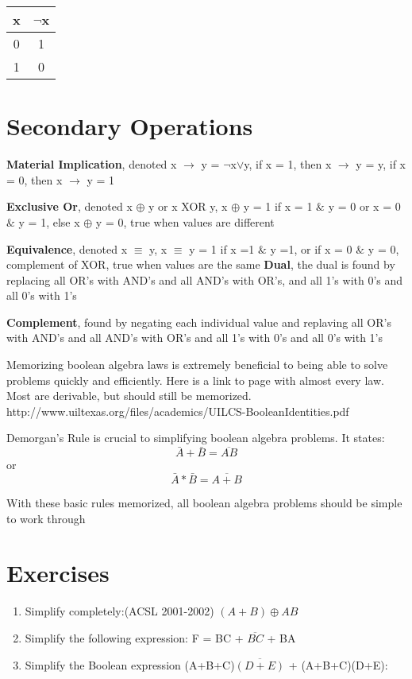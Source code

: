 \documentclass[10pt]{article}
\begin{document}
\begin{center}
\begin{tabular}{ |c|c| }
 \hline
 x & $\neg$x \\
 \hline
  0 & 1  \\
 \hline
 1 & 0 \\
 \hline
\end{tabular}
\end{center}

\section{Secondary Operations}

\textbf{Material Implication}, denoted  x $\rightarrow$ y = $\neg$x$\lor$y, if x = 1, then x $\rightarrow$ y = y, if x = 0, then x $\rightarrow$ y = 1

\noindent
\textbf{Exclusive Or}, denoted x $\oplus$ y or x XOR y, x $\oplus$ y = 1 if x = 1 $\&$ y = 0 or x = 0 $\&$ y = 1, else x $\oplus$ y = 0, true when values are different

\noindent
\textbf{Equivalence}, denoted x $\equiv$ y, x $\equiv$ y = 1 if x =1 $\&$ y =1, or if x = 0 $\&$ y = 0, complement of XOR, true when values are the same
\noindent
\textbf{Dual}, the dual is found by replacing all OR's with AND's and all AND's with OR's, and all 1's with 0's and all 0's with 1's

\noindent
\textbf{Complement}, found by negating each individual value and replaving all OR's with AND's and all AND's with OR's and all 1's with 0's and all 0's with 1's
\bigskip

\noindent
Memorizing boolean algebra laws is extremely beneficial to being able to solve problems quickly and efficiently. Here is a link to page with almost every law. Most are derivable, but should still be memorized.  http://www.uiltexas.org/files/academics/UILCS-BooleanIdentities.pdf

Demorgan's Rule is crucial to simplifying boolean algebra problems. It states: $$ \bar{A} + \bar{B} = \overline{AB}$$ or $$ \bar{A} * \bar{B} = \overline{A+B}$$

\bigskip

\noindent
With these basic rules memorized, all boolean algebra problems should be simple to work through

\section{Exercises}
\begin{enumerate}
\item Simplify completely:(ACSL 2001-2002)
$( A + B )\oplus A B$

\item Simplify the following expression: F = BC + $\overline{BC}$ + BA

\item Simplify the Boolean expression (A+B+C)$\overline{(D+E)}$ + (A+B+C)(D+E):
\end{enumerate}
\end{document}
